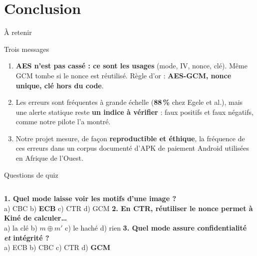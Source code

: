 \documentclass[aspectratio=169,10pt]{beamer}
\begin{document}
\section{Conclusion}

\begin{frame}{À retenir}
  \begin{block}{Trois messages}
    \begin{enumerate}
      \item \textbf{AES n'est pas cassé : ce sont les usages} (mode, IV, nonce, clé). Même GCM tombe si le nonce est réutilisé.
            Règle d'or : \textbf{AES-GCM, nonce unique, clé hors du code}.
      \item Les erreurs sont fréquentes à grande échelle (\textbf{88\,\%} chez Egele et al.), mais une alerte statique
            reste \textbf{un indice à vérifier} : faux positifs et faux négatifs, comme notre pilote l'a montré.
      \item Notre projet mesure, de façon \textbf{reproductible et éthique}, la fréquence de ces erreurs dans un corpus documenté
            d'APK de paiement Android utilisées en Afrique de l'Ouest.
    \end{enumerate}
  \end{block}
\end{frame}

\begin{frame}{Questions de quiz}
  \scriptsize
  \begin{columns}[T]
    \textbf{1. Quel mode laisse voir les motifs d'une image ?}\\
    a) CBC \quad b) \textbf{ECB} \quad c) CTR \quad d) GCM
    \textbf{2. En CTR, réutiliser le nonce permet à Kiné de calculer\ldots}\\
    a) la clé \quad b) \textbf{$m \oplus m'$} \quad c) le haché \quad d) rien
    \textbf{3. Quel mode assure confidentialité \emph{et} intégrité ?}\\
    a) ECB \quad b) CBC \quad c) CTR \quad d) \textbf{GCM}
  \end{columns}
\end{frame}
\end{document}
